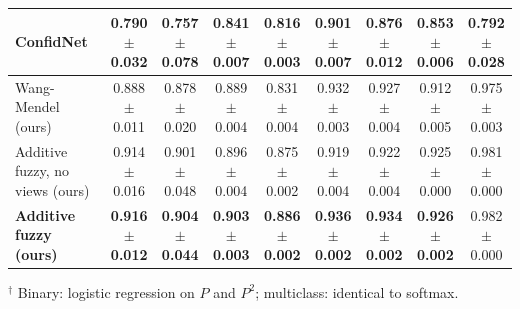 \begin{table}[t]
{\begin{tabular}{lcccccccc}
ConfidNet~\cite{corbiere2019} & 0.790$\pm$0.032 & 0.757$\pm$0.078 & 0.841$\pm$0.007 & 0.816$\pm$0.003 & 0.901$\pm$0.007 & 0.876$\pm$0.012 & 0.853$\pm$0.006 & 0.792$\pm$0.028 \\
\midrule
Wang-Mendel (ours) & 0.888$\pm$0.011 & 0.878$\pm$0.020 & 0.889$\pm$0.004 & 0.831$\pm$0.004 & 0.932$\pm$0.003 & 0.927$\pm$0.004 & 0.912$\pm$0.005 & 0.975$\pm$0.003 \\
Additive fuzzy, no views (ours) & 0.914$\pm$0.016 & 0.901$\pm$0.048 & 0.896$\pm$0.004 & 0.875$\pm$0.002 & 0.919$\pm$0.004 & 0.922$\pm$0.004 & 0.925$\pm$0.000 & 0.981$\pm$0.000 \\
\textbf{Additive fuzzy (ours)} & \textbf{0.916$\pm$0.012} & \textbf{0.904$\pm$0.044} & \textbf{0.903$\pm$0.003} & \textbf{0.886$\pm$0.002} & \textbf{0.936$\pm$0.002} & \textbf{0.934$\pm$0.002} & \textbf{0.926$\pm$0.002} & 0.982$\pm$0.000 \\
\bottomrule
\end{tabular}}

\vspace{2pt}
\footnotesize $^\dagger$ Binary: logistic regression on $P$ and $P^2$; multiclass: identical to softmax.
\end{table}

